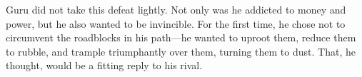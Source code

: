 Guru did not take this defeat lightly. Not only was he addicted to money and
power, but he also wanted to be invincible. For the first time, he chose not to
circumvent the roadblocks in his path—he wanted to uproot them, reduce them to
rubble, and trample triumphantly over them, turning them to dust. That, he thought,
would be a fitting reply to his rival.
